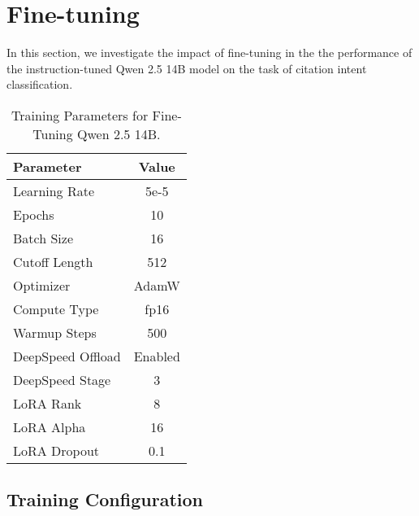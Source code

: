 \section{Fine-tuning}\label{sec:fine_tuning}

In this section, we investigate the impact of fine-tuning in the the performance of the instruction-tuned Qwen 2.5 14B model on the task of citation intent classification. 

\begin{table}[t]
    \centering
    \footnotesize
    \begin{tabular}{lc}
        \hline
        \textbf{Parameter}           & \textbf{Value} \\
        \hline
        Learning Rate                & 5e-5           \\
        Epochs                       & 10             \\
        Batch Size                   & 16             \\
        Cutoff Length                & 512            \\
        Optimizer                    & AdamW          \\
        Compute Type                 & fp16           \\
        Warmup Steps                 & 500            \\
        DeepSpeed Offload            & Enabled        \\
        DeepSpeed Stage              & 3              \\
        LoRA Rank                    & 8              \\
        LoRA Alpha                   & 16             \\
        LoRA Dropout                 & 0.1            \\
        \hline
    \end{tabular}
    \caption{Training Parameters for Fine-Tuning Qwen 2.5 14B.}\label{tab:training_parameters}
\end{table}

\subsection{Training Configuration}

